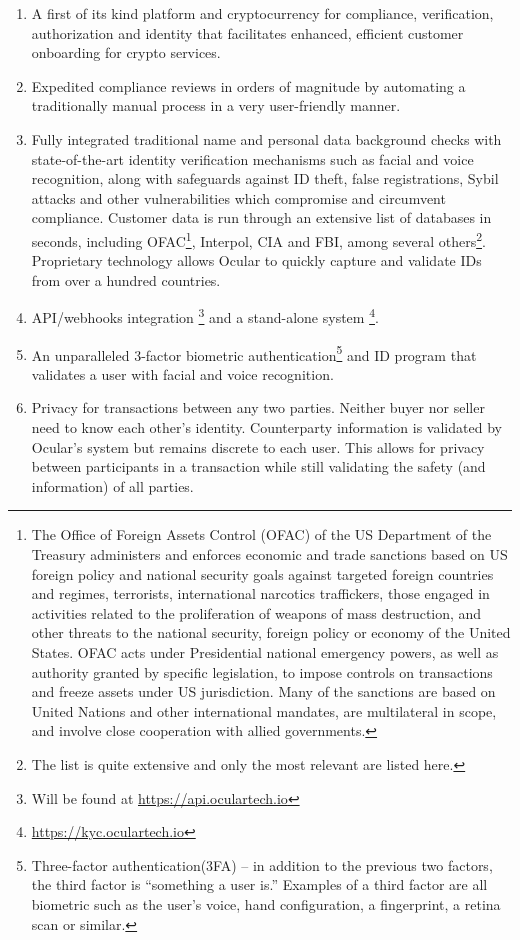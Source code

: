 \documentclass[12pt]{article}
\begin{document}
\begin{enumerate}
\item A first of its kind platform and cryptocurrency for compliance, verification, authorization and identity that facilitates enhanced, efficient customer onboarding for crypto services.
\item Expedited compliance reviews in orders of magnitude by automating a traditionally manual process in a very user-friendly manner.   
\item Fully integrated traditional name and personal data background checks with state-of-the-art identity verification mechanisms such as facial and voice recognition, along with safeguards against ID theft, false registrations, Sybil attacks and other vulnerabilities which compromise and circumvent compliance. Customer data is run through an extensive list of databases in seconds, including OFAC\footnote{The Office of Foreign Assets Control (OFAC) of the US Department of the Treasury administers and enforces economic and trade sanctions based on US foreign policy and national security goals against targeted foreign countries and regimes, terrorists, international narcotics traffickers, those engaged in activities related to the proliferation of weapons of mass destruction, and other threats to the national security, foreign policy or economy of the United States. OFAC acts under Presidential national emergency powers, as well as authority granted by specific legislation, to impose controls on transactions and freeze assets under US jurisdiction. Many of the sanctions are based on United Nations and other international mandates, are multilateral in scope, and involve close cooperation with allied governments.}, Interpol, CIA and FBI, among several others\footnote{The list is quite extensive and only the most relevant are listed here.}. Proprietary technology allows Ocular to quickly capture and validate IDs from over a hundred countries. 
\item API/webhooks integration \footnote{Will be found at \url{https://api.oculartech.io}} and a stand-alone system \footnote{\url{https://kyc.oculartech.io}}. 
\item An unparalleled 3-factor biometric authentication\footnote{Three-factor authentication(3FA) – in addition to the previous two factors, the third factor is “something a user is.” Examples of a third factor are all biometric such as the user's voice, hand configuration, a fingerprint, a retina scan or similar.} and ID program that validates a user with facial and voice recognition.
\item Privacy for transactions between any two parties. Neither buyer nor seller need to know each other’s identity. Counterparty information is validated by Ocular’s system but remains discrete to each user. This allows for privacy between participants in a transaction while still validating the safety (and information) of all parties. 
\end{enumerate}
\end{document}
